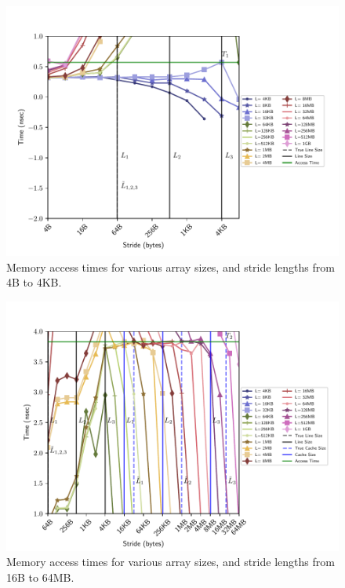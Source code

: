 \documentclass[letterpaper]{article}
\begin{document}
\begin{figure}[H]
  \centering
  \includegraphics[width=\textwidth]{figures/membench_lowerleft.pdf}
  \caption{Memory access times for various array sizes, and stride lengths from 4B to 4KB.}
  \label{fig:membench_lowerleft}
\end{figure}


\begin{figure}[H]
  \centering
  \includegraphics[width=\textwidth]{figures/membench_middle.pdf}
  \caption{Memory access times for various array sizes, and stride lengths from 16B to 64MB.}
  \label{fig:membench_middle}
\end{figure}
\end{document}
